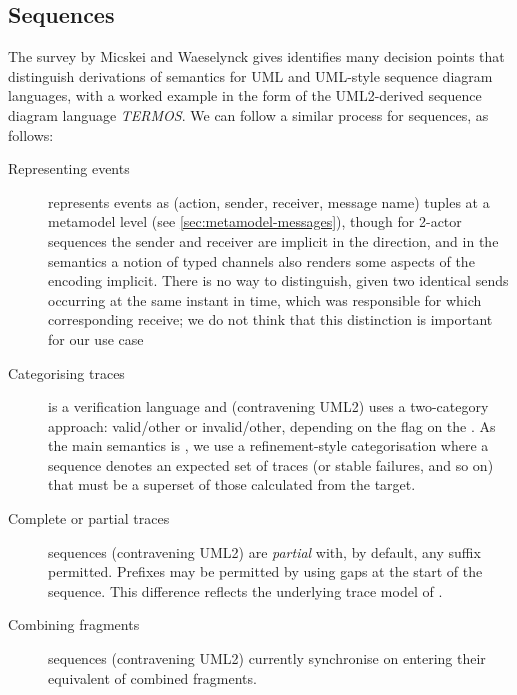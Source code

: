 

\subsection{Sequences}

The survey by Micskei and Waeselynck gives identifies many decision points that
distinguish derivations of semantics for UML and UML-style sequence diagram
languages, with a worked example in the form of the
UML2-derived sequence diagram language \emph{TERMOS}.
We can follow a similar process for \langname{} sequences, as follows:

\begin{description}
\item[Representing events]
  \langname{} represents events as (action, sender, receiver, message name)
  tuples at a metamodel level (see \cref{sec:metamodel-messages}),
  though for 2-actor sequences the sender and
  receiver are implicit in the direction, and in the \tockcsp{} semantics a
  notion of typed channels also renders some aspects of the encoding implicit.
  There is no way to distinguish, given two identical sends occurring at the
  same instant in time, which was responsible for which corresponding receive;
  we do not think that this distinction is important for our use case
\item[Categorising traces]
  \langname{} is a verification language and (contravening UML2)
  uses a two-category approach: valid/other or invalid/other, depending on the
   flag on the \massertion.
  As the main \langname{} semantics is \tockcsp, we use a
  refinement-style categorisation where a sequence denotes an
  expected set of traces (or stable failures, and so on) that must be a superset
  of those calculated from the target.
\item[Complete or partial traces]
  \langname{} sequences (contravening UML2) are \emph{partial} with, by default,
  any suffix permitted.  Prefixes may be permitted by using gaps at the start of
  the sequence.  This difference reflects the underlying trace model of \tockcsp.
\item[Combining fragments]
  \langname{} sequences (contravening UML2) currently synchronise on entering
  their equivalent of combined fragments.  
\end{description}
